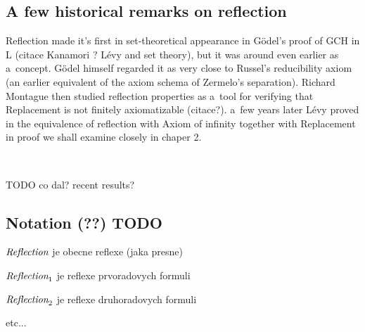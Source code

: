 \documentclass[12pt,a4paper]{article}
\newcommand{\bce}{\begin{compactenum}}
\newcommand{\ece}{\end{compactenum}}
\begin{document}

\subsection{A few historical remarks on reflection}\label{sec:History}  %
 
 
Reflection made it's first in set-theoretical appearance in G{\"o}del's proof of GCH in L  (citace Kanamori ? Lévy and set theory), but it was around even earlier as a~concept. G{\"o}del himself regarded it as very close to Russel's reducibility axiom (an earlier equivalent of the axiom schema of Zermelo's separation). Richard Montague then studied reflection properties as a~tool for verifying that Replacement is not finitely axiomatizable (citace?). a~few years later Lévy proved in \cite{Levy60a} the equivalence of reflection with Axiom of infinity together with Replacement in proof we shall examine closely in chaper 2.

\

TODO co dal? recent results?



% 

\subsection{Notation (??) TODO}
\bce
\item $\emph{Reflection}$ je obecne reflexe (jaka presne)
\item $\emph{Reflection}_1$ je reflexe prvoradovych formuli
\item $\emph{Reflection}_2$ je reflexe druhoradovych formuli
\item etc...
\ece
\end{document}
